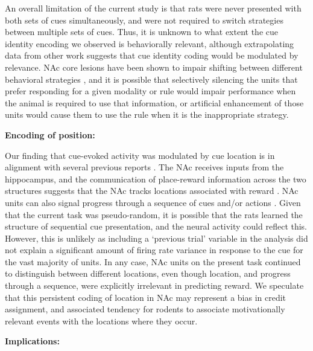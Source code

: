 \documentclass[11pt]{article}
\let\cite=\citep
\begin{document}
{An overall limitation of the current study is that rats were never
presented with both sets of cues simultaneously, and were not required
to switch strategies between multiple sets of cues. Thus, it is
unknown to what extent the cue identity encoding we observed is
behaviorally relevant, although extrapolating data from other work
\cite{Sleezer2016} suggests that cue identity coding would be
modulated by relevance. NAc core lesions have been shown to impair
shifting between different behavioral strategies \cite{Floresco2006a},
and it is possible that selectively silencing the units that prefer
responding for a given modality or rule would impair performance when
the animal is required to use that information, or artificial
enhancement of those units would cause them to use the rule when it is
the inappropriate strategy.

{\bf Encoding of position:}

Our finding that cue-evoked activity was modulated by cue location is
in alignment with several previous reports
\cite{Lavoie1994,Wiener2003,Mulder2005,Strait2016}. The NAc receives
inputs from the hippocampus, and the communication of place-reward
information across the two structures suggests that the NAc tracks
locations associated with reward
\cite{Tabuchi2000,Pennartz2004,Lansink2008,Lansink2009,VanderMeer2011,Lansink2016,Sjulson2017}. NAc
units can also signal progress through a sequence of cues and/or
actions
\cite{Shidara1998,Mulder2004,Khamassi2008,Berke2009,Lansink2012,Atallah2014}. Given
that the current task was pseudo-random, it is possible that the rats
learned the structure of sequential cue presentation, and the neural
activity could reflect this. However, this is unlikely as including a
‘previous trial’ variable in the analysis did not explain a
significant amount of firing rate variance in response to the cue for
the vast majority of units. In any case, NAc units on the present
task continued to distinguish between different locations, even though
location, and progress through a sequence, were explicitly irrelevant
in predicting reward. We speculate that this persistent coding of
location in NAc may represent a bias in credit assignment, and
associated tendency for rodents to associate motivationally relevant
events with the locations where they occur.

{\bf Implications:}

}
\end{document}
